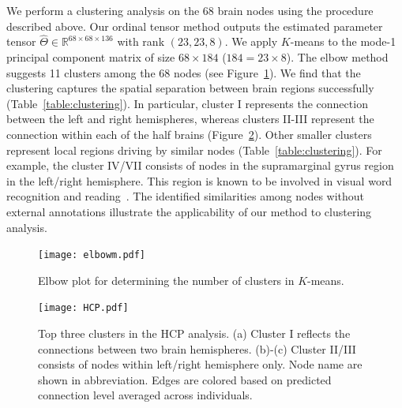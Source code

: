 \documentclass{article}
\theoremstyle{plain}
\theoremstyle{definition}
\begin{document}
We perform a clustering analysis on the 68 brain nodes using the procedure described above. Our ordinal tensor method outputs the estimated parameter tensor $\hat\Theta\in\mathbb{R}^{68\times 68\times136}$ with rank $(23,23,8)$. We apply $K$-means to the mode-1 principal component matrix of size $68\times 184$ ($184=23\times8$). The elbow method suggests 11 clusters among the 68 nodes (see Figure~\ref{figure:elbow}). We find that the clustering captures the spatial separation between brain regions successfully (Table~\ref{table:clustering}).
In particular, cluster I represents the connection between the left and right hemispheres, whereas clusters II-III represent the connection within each of the half brains (Figure~\ref{figure:brain image}). Other smaller clusters represent local regions driving by similar nodes (Table~\ref{table:clustering}). For example, the cluster IV/VII consists of nodes in the supramarginal gyrus region in the left/right hemisphere. This region is known to be involved in visual word recognition and reading~\citep{stoeckel2009supramarginal}. The identified similarities among nodes without external annotations illustrate the applicability of our method to clustering analysis.

\begin{figure}[ht]
\begin{center}
\texttt{[image: elbowm.pdf]}
\end{center}
\caption{Elbow plot for determining the number of clusters in $K$-means.}\label{figure:elbow}
\end{figure}


\begin{figure}[H]
\centering
\texttt{[image: HCP.pdf]}
\caption{Top three clusters in the HCP analysis. (a) Cluster I reflects the connections between two brain hemispheres. (b)-(c) Cluster II/III consists of nodes within left/right hemisphere only. Node name are shown in abbreviation. Edges are colored based on predicted connection level averaged across individuals. }  \label{figure:brain image}
\end{figure}
\end{document}
